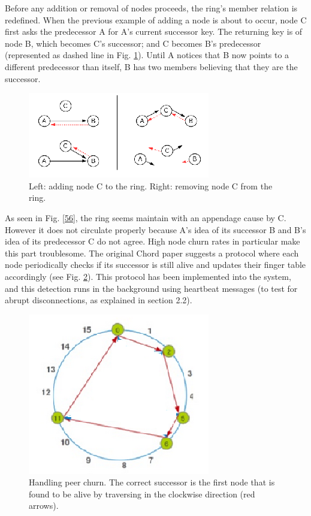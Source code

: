 \documentclass[fleqn,24pt]{SelfArx} %
\begin{document}
Before any addition or removal of nodes proceeds, the ring's member relation is redefined. When the previous example of adding a node is about to occur, node C first asks the predecessor A for A's current successor key. The returning key is of node B, which becomes C's successor; and C becomes B's predecessor (represented as dashed line in Fig. \ref{55}). Until A notices that B now points to a different predecessor than itself, B has two members believing that they are the successor. 

\begin{figure}[!htb]
\includegraphics{figure3.png}
\caption{\label{family}Left: adding node C to the ring. Right: removing node C from the ring.}
\label{55}
\end{figure}

As seen in Fig. \ref{56}, the ring seems maintain with an appendage cause by C. However it does not circulate properly because A's idea of its successor B and B's idea of its predecessor C do not agree. High node churn rates in particular make this part troublesome. The original Chord paper \cite{2} suggests a protocol where each node periodically checks if its successor is still alive and updates their finger table accordingly (see Fig. \ref{5}). This protocol has been implemented into the system, and this detection runs in the background using heartbeat messages (to test for abrupt disconnections, as explained in section 2.2).

\begin{figure}[!htb]
\includegraphics{stabilize1.png}
\caption{\label{family}Handling peer churn. The correct successor is the first node that is found to be alive by traversing in the clockwise direction (red arrows).}
\label{5}
\end{figure} 
\end{document}
